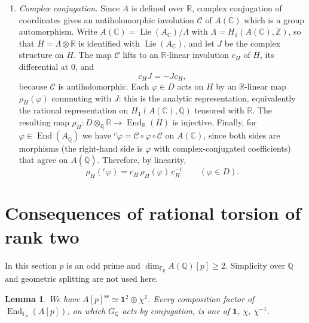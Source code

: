 \documentclass[11pt]{article}
\newtheorem{lemma}{Lemma}
\newcommand{\Q}{\mathbb Q}
\newcommand{\Z}{\mathbb Z}
\newcommand{\F}{\mathbb F}
\newcommand{\R}{\mathbb R}
\newcommand{\C}{\mathbb C}
\DeclareMathOperator{\End}{End}
\DeclareMathOperator{\Lie}{Lie}
\begin{document}
\begin{enumerate}
\item[(F5)] \emph{Complex conjugation.} Since \(A\) is defined over
\(\R\), complex conjugation of coordinates gives an antiholomorphic
involution \(\mathcal C\) of \(A(\C)\) which is a group automorphism.
Write \(A(\C)=\Lie(A_{\C})/\Lambda\) with \(\Lambda=H_1(A(\C),\Z)\), so
that \(H=\Lambda\otimes\R\) is identified with \(\Lie(A_{\C})\), and let
\(J\) be the complex structure on \(H\). The map \(\mathcal C\) lifts
to an \(\R\)-linear involution \(c_H\) of \(H\), its differential at
\(0\), and
\[
 c_HJ=-Jc_H,
\]
because \(\mathcal C\) is antiholomorphic. Each \(\varphi\in D\) acts
on \(H\) by an \(\R\)-linear map \(\rho_H(\varphi)\) commuting with
\(J\): this is the analytic representation, equivalently the rational
representation on \(H_1(A(\C),\Q)\) tensored with \(\R\). The resulting
map \(\rho_H:D\otimes_{\Q}\R\to\End_{\R}(H)\) is injective. Finally, for \(\varphi\in\End(A_{\overline{\Q}})\) we have
\({}^c\varphi=\mathcal C\circ\varphi\circ\mathcal C\) on \(A(\C)\),
since both sides are morphisms (the right-hand side is \(\varphi\) with
complex-conjugated coefficients) that agree on \(A(\overline{\Q})\).
Therefore, by linearity,
\[
 \rho_H({}^c\varphi)=c_H\,\rho_H(\varphi)\,c_H^{-1}
 \qquad(\varphi\in D).
\]
\end{enumerate}

\section{Consequences of rational torsion of rank two}\label{sec:rank-two}

In this section \(p\) is an odd prime and
\(\dim_{\F_p}A(\Q)[p]\geq2\). Simplicity over \(\Q\) and geometric
splitting are not used here.

\begin{lemma}\label{lem:ss}
We have \(A[p]^{\mathrm{ss}}\simeq\mathbf 1^2\oplus\chi^2\). Every
composition factor of \(\End_{\F_p}(A[p])\), on which \(G_{\Q}\) acts
by conjugation, is one of \(\mathbf 1\), \(\chi\), \(\chi^{-1}\).
\end{lemma}
\end{document}
